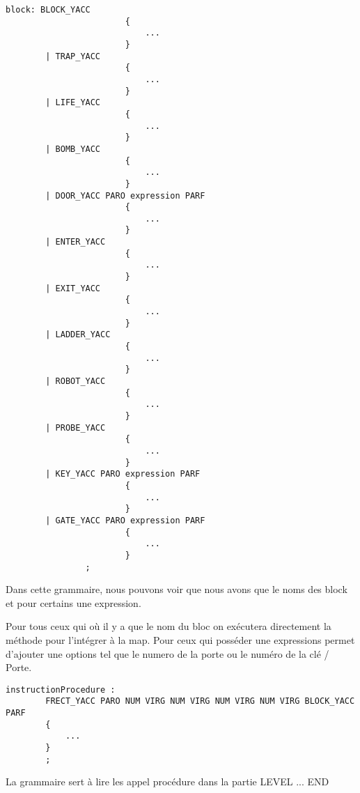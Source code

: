 \lstset{style=mystyle}
\begin{lstlisting}[caption=Bloc]
block: BLOCK_YACC 
                        {
                            ...
                        }
        | TRAP_YACC 
                        {
                            ...
                        }
        | LIFE_YACC
                        {
                            ...
                        }
        | BOMB_YACC 
                        {
                            ...
                        }
        | DOOR_YACC PARO expression PARF
                        {   
                            ...
                        }
        | ENTER_YACC 
                        {
                            ...
                        }
        | EXIT_YACC 
                        {
                            ...
                        }
        | LADDER_YACC 
                        {
                            ...
                        }
        | ROBOT_YACC 
                        {
                            ...
                        }
        | PROBE_YACC 
                        {
                            ...
                        }
        | KEY_YACC PARO expression PARF
                        {
                            ...
                        }
        | GATE_YACC PARO expression PARF 
                        {
                            ...
                        }
                ;
\end{lstlisting}

Dans cette grammaire, nous pouvons voir que nous avons que le noms des block et pour certains une expression.

Pour tous ceux qui où il y a que le nom du bloc on exécutera directement la méthode pour l'intégrer à la map.
Pour ceux qui posséder une expressions permet d'ajouter une options tel que le numero de la porte ou le numéro de la clé / Porte. 


\newpage

\lstset{style=mystyle}
\begin{lstlisting}[caption=Bloc]
    instructionProcedure : 
        FRECT_YACC PARO NUM VIRG NUM VIRG NUM VIRG NUM VIRG BLOCK_YACC PARF
        {
            ...
        } 
        ;    
\end{lstlisting}

La grammaire sert à lire les appel procédure dans la partie LEVEL ... END

\newpage